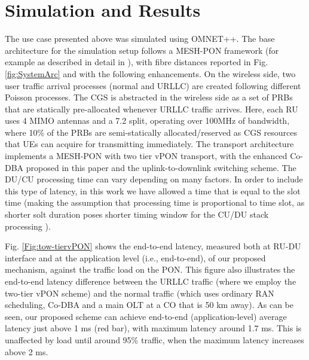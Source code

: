 \documentclass[a4paper, oneside, twocolumn, notitlepage, 10pt]{extarticle_ecoc}
\begin{document}
	 

    
\section{Simulation and Results} \label{sec:Results}
The use case presented above was simulated using OMNET++. The base architecture for the simulation setup follows a MESH-PON framework (for example as described in detail in \cite{MESH-Networks}), with fibre distances reported in Fig. \ref{fig:SystemArc} and with the following enhancements. On the wireless side, two user traffic arrival processes (normal and URLLC) are created following different Poisson processes. The \ac{CGS} is abstracted in the wireless side as a set of PRBs that are statically pre-allocated whenever URLLC traffic arrives. Here, each RU uses 4 MIMO antennas and a 7.2 split, operating over 100MHz of bandwidth, where 10\% of the PRBs are semi-statically allocated/reserved as CGS resources that UEs can acquire for transmitting immediately. The transport architecture implements a MESH-PON with two tier vPON transport, with the enhanced Co-DBA proposed in this paper and the uplink-to-downlink switching scheme. The DU/CU processing time can vary depending on many factors. In order to include this type of latency, in this work we have allowed a time that is equal to the slot time (making the assumption that processing time is proportional to time slot, as shorter solt duration poses shorter timing window for the CU/DU stack processing \cite{DU_proc_Timing}).%

Fig. \ref{Fig:tow-tiervPON} shows the end-to-end latency, measured both at RU-DU interface and at the application level (i.e., end-to-end), of our proposed mechanism, against the traffic load on the PON. This figure also illustrates the end-to-end latency difference between the URLLC traffic (where we employ the two-tier vPON scheme) and the normal traffic (which uses ordinary RAN scheduling, Co-DBA and a main OLT at a CO that is 50 km away). As can be seen, our proposed scheme can achieve end-to-end (application-level) average latency just above 1 ms (red bar), with maximum latency around 1.7 ms. This is unaffected by load until around 95\% traffic, when the maximum latency increases above 2 ms.
\end{document}
